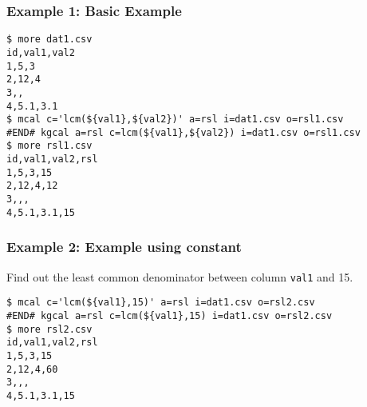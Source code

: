 \subsubsection*{Example 1: Basic Example}



\begin{Verbatim}[baselinestretch=0.7,frame=single]
$ more dat1.csv
id,val1,val2
1,5,3
2,12,4
3,,
4,5.1,3.1
$ mcal c='lcm(${val1},${val2})' a=rsl i=dat1.csv o=rsl1.csv
#END# kgcal a=rsl c=lcm(${val1},${val2}) i=dat1.csv o=rsl1.csv
$ more rsl1.csv
id,val1,val2,rsl
1,5,3,15
2,12,4,12
3,,,
4,5.1,3.1,15
\end{Verbatim}
\subsubsection*{Example 2: Example using constant}

Find out the least common denominator between column \verb|val1| and 15.


\begin{Verbatim}[baselinestretch=0.7,frame=single]
$ mcal c='lcm(${val1},15)' a=rsl i=dat1.csv o=rsl2.csv
#END# kgcal a=rsl c=lcm(${val1},15) i=dat1.csv o=rsl2.csv
$ more rsl2.csv
id,val1,val2,rsl
1,5,3,15
2,12,4,60
3,,,
4,5.1,3.1,15
\end{Verbatim}
